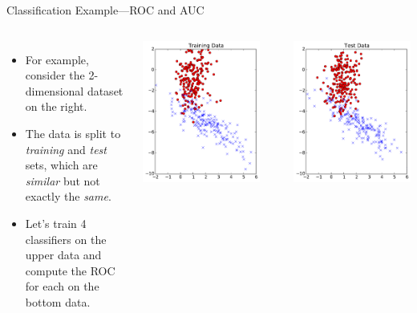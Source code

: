 \documentclass[10pt, aspectratio=169]{beamer} %
\begin{document}
\begin{frame}{Classification Example---ROC and AUC}
\begin{columns}
\begin{itemize}
\item For example, consider the 2-dimensional dataset on the right.
\item The data is split to \textit{training} and \textit{test} sets, which
are \textit{similar} but not exactly the \textit{same}.
\item Let's train 4 classifiers on the upper data and compute the ROC 
for each on the bottom data.
\end{itemize}
\centerline{\includegraphics[width=0.8\columnwidth]{TrainingData_2class.pdf}}\\
\centerline{\includegraphics[width=0.8\columnwidth]{TestData_2class.pdf}}

\end{columns}
\end{frame}
\end{document}

